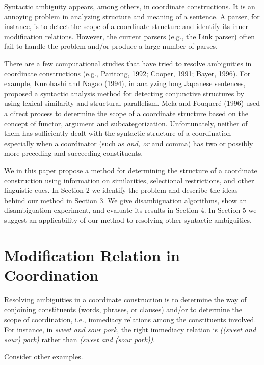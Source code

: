 Syntactic ambiguity appears, among others, in coordinate constructions.
It is an annoying problem in analyzing structure and meaning of a 
sentence.  A parser, for instance, is to detect the scope of a
coordinate structure and identify its inner modification relations. 
However, the current parsers (e.g., the Link parser) often fail to
handle the problem and/or produce a large number of parses.

    There are a few computational studies that have tried to resolve
ambiguities in coordinate constructions (e.g., Paritong, 1992; Cooper,
1991; Bayer, 1996). For example,  Kurohashi and Nagao (1994), in
analyzing long Japanese sentences, proposed a syntactic analysis
method for detecting conjunctive structures by using lexical similarity 
and structural parallelism.  
Mela and Fouquer\'e (1996) used a direct process to
determine the scope of a coordinate structure based on the concept of
functor, argument and subcategorization. Unfortunately, neither of them
 has sufficiently dealt with  the syntactic structure of a coordination
especially when a coordinator (such as {\it and, or} and comma) has two or
possibly more preceding and succeeding constituents.


We in this paper propose a method for determining the structure 
of a coordinate construction using information on
similarities, selectional restrictions, and other
linguistic cues. In Section 2 we identify the problem and describe the 
ideas behind our method in Section 3.  We give disambiguation
algorithms, show an disambiguation experiment,  and evaluate its
results in Section 4.  In Section 5  we suggest an 
applicability of our method to resolving other syntactic ambiguities.



\section {Modification Relation in Coordination}

 Resolving  ambiguities in a coordinate construction is to determine
the way of conjoining constituents (words, phrases, or clauses) and/or  to
determine the scope of coordination, i.e., immediacy relations among the
constituents involved.  For instance, in {\it sweet and sour pork}, the right
immediacy relation is {\it ((sweet and sour) pork)} rather than {\it (sweet and
(sour pork))}.

     Consider other examples.

 \vspace*{4mm}

